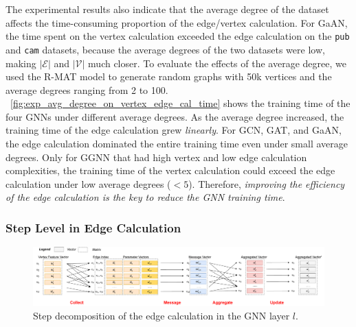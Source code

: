 The experimental results also indicate that the average degree of the dataset affects the time-consuming proportion of the edge/vertex calculation.
For GaAN, the time spent on the vertex calculation exceeded the edge calculation on the \texttt{pub} and \texttt{cam} datasets, because the average degrees of the two datasets were low, making $|\mathcal{E}|$ and $|\mathcal{V}|$ much closer.
To evaluate the effects of the average degree, we used the R-MAT model to generate random graphs with 50k vertices and the average degrees ranging from 2 to 100.
\figurename~\ref{fig:exp_avg_degree_on_vertex_edge_cal_time} shows the training time of the four GNNs under different average degrees.
As the average degree increased, the training time of the edge calculation grew \emph{linearly}.
For GCN, GAT, and GaAN, the edge calculation dominated the entire training time even under small average degrees.
Only for GGNN that had high vertex and low edge calculation complexities, the training time of the vertex calculation could exceed the edge calculation under low average degrees ($<5$).
Therefore, \emph{improving the efficiency of the edge calculation is the key to reduce the GNN training time}.

\subsubsection{Step Level in Edge Calculation}

\begin{figure}
    \centering
    \includegraphics[width=1\columnwidth]{figs/illustration/steps_in_edge_calculation.pdf}
    \caption{Step decomposition of the edge calculation in the GNN layer $l$.}
    \label{fig:steps_in_edge_calculation}
\end{figure}

